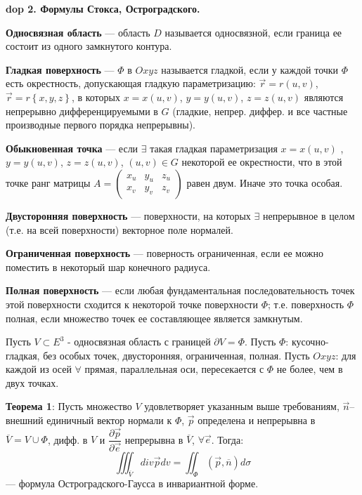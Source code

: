 \textbf{\LARGE dop 2. Формулы Стокса, Остроградского.}



\par \textbf{Односвязная область} --- область $D$ называется односвязной, если
граница ее состоит из одного замкнутого контура.

\par \textbf{Гладкая поверхность} --- $\Phi$ в $Oxyz$ называется гладкой, если у каждой точки $\Phi$ есть окрестность, допускающая гладкую параметризацию: $\overrightarrow{r}=r\left( u,v\right)$,  $\overrightarrow{r}=r\left\{ x,y,z\right\}$, в которых $x = x\left( u,v\right)$, $y = y\left( u,v\right)$, $z = z\left( u,v\right)$ являются непрерывно дифференцируемыми в $G$ (гладкие, непрер. диффер. и все частные производные первого порядка непрерывны).

\par \textbf{Обыкновенная точка} --- если $\exists$ такая гладкая параметризация $x = x\left( u,v\right)$ , $y = y\left( u,v\right)$, $z = z\left( u,v\right)$, $\left( u,v\right) \in G$ некоторой ее окрестности, что в этой точке ранг матрицы $A=\begin{pmatrix} x_{u} & y_{u} & z_{u} \\ x_{v} & y_{v} & z_{v} \end{pmatrix}$ равен двум. Иначе это точка особая.

\par \textbf{Двусторонняя поверхность} --- поверхности, на которых $\exists$ непрерывное в целом (т.е. на всей поверхности) векторное поле нормалей.

\par \textbf{Ограниченная поверхность} --- поверность ограниченная, если ее можно поместить в некоторый шар конечного радиуса.

\par \textbf{Полная поверхность} --- если любая фундаментальная последовательность точек этой поверхности сходится к некоторой точке поверхности $\Phi$; т.е. поверхность $\Phi$ полная, если множество точек ее составляющее является замкнутым.

\par Пусть $V\subset E^{3}$ - односвязная область с границей $\partial V=\Phi $. Пусть $\Phi$: кусочно-гладкая, без особых точек, двусторонняя, ограниченная, полная. Пусть $Oxyz$: для каждой из осей $\forall$ прямая, параллельная оси, пересекается с $\Phi$ не более, чем в двух точках.
\par \textbf{Теорема 1}: Пусть множество $V$ удовлетворяет указанным выше требованиям, $\overrightarrow{n}$– внешний единичный вектор нормали к $\Phi$, $\overrightarrow{p}$ определена и непрерывна в $\overline{V}=V\cup \Phi$, дифф. в $V$ и $\dfrac{\partial \overrightarrow{p}}{\partial \overrightarrow{e}}$ непрерывна в $\overline{V}$, $\forall \overrightarrow{e}$.
Тогда:\begin{equation*} \iiint _{\overline{V}}div\overrightarrow{p}dv=\iint _{\Phi }\left( \overrightarrow{p},\overline{n}\right) d\sigma \end{equation*} --- формула Остроградского-Гаусса в инвариантной форме.

